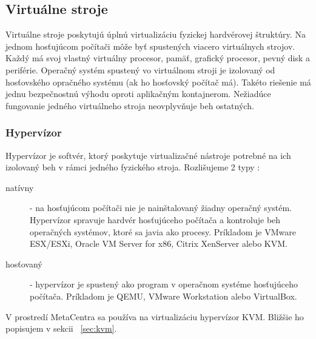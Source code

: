 \documentclass[printed,11pt,twoside,color,cover,table]{fithesis3}
\begin{document}
\subsection{Virtuálne stroje}
Virtuálne stroje poskytujú úplnú virtualizáciu fyzickej hardvérovej štruktúry. Na jednom hosťujúcom počítači môže byť spustených viacero virtuálnych strojov. Každý má svoj vlastný virtuálny procesor, pamäť, grafický procesor, pevný disk 
a periférie. Operačný systém spustený vo virtuálnom stroji je izolovaný od hosťovského opračného systému (ak ho hosťovský počítač má). Takéto riešenie má jednu bezpečnostnú výhodu oproti aplikačným 
kontajnerom. Nežiadúce fungovanie jedného virtuálneho stroja neovplyvňuje beh ostatných.

\subsubsection{Hypervízor}
Hypervízor je softvér, ktorý poskytuje virtualizačné nástroje potrebné na ich izolovaný beh v rámci jedného fyzického stroja. Rozlišujeme 2 typy \cite{hypervisorTypes}:
\begin{description}
\item[natívny] - na hosťujúcom počítači nie je nainštalovaný žiadny operačný systém. Hypervízor spravuje hardvér hosťujúceho počítača a kontroluje beh operačných systémov, ktoré sa javia ako procesy.
Príkladom je VMware ESX/ESXi\footnotemark{}, Oracle VM Server for x86\footnotemark{},
Citrix XenServer\footnotemark{} alebo KVM\footnotemark{}.
\item[hosťovaný] - hypervízor je spustený ako program v operačnom systéme hosťujúceho počítača. Príkladom je QEMU, VMware Workstation alebo VirtualBox.
\end{description}
V prostredí MetaCentra sa používa na virtualizáciu hypervízor KVM. Bližšie ho popisujem v sekcii ~\ref{sec:kvm}.
\end{document}
